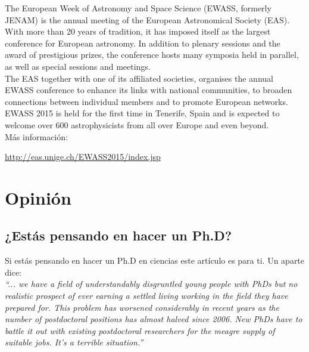 \documentclass{book}
\begin{document}
The European Week of Astronomy and Space Science (EWASS, formerly JENAM) is the annual meeting of the European Astronomical Society (EAS). With more than 20 years of tradition, it has imposed itself as the largest conference for European astronomy. In addition to plenary sessions and the award of prestigious prizes, the conference hosts many symposia held in parallel, as well as special sessions and meetings.\\

\noindent The EAS together with one of its affiliated societies, organises the annual EWASS conference to enhance its links with national communities, to broaden connections between individual members and to promote European networks.\\

\noindent EWASS 2015 is held for the first time in Tenerife, Spain and is expected to welcome over 600 astrophysicists from all over Europe and even beyond.\\

\noindent Más información:
\begin{center}
\url{ http://eas.unige.ch/EWASS2015/index.jsp}
\end{center}


\section*{Opinión}

\subsection{¿Estás pensando en hacer un Ph.D?}

Si estás pensando en hacer un Ph.D en ciencias este artículo es para ti. Un aparte dice:\\

\textit{``... we have a field of understandably disgruntled young people with PhDs but no realistic prospect of ever earning a settled living working in the field they have prepared for. This problem has worsened considerably in recent  years as the number of postdoctoral positions has almost halved since 2006. New PhDs have to battle it out with existing postdoctoral researchers for the meagre supply of suitable jobs. It’s a terrible situation.''}\\
\end{document}
